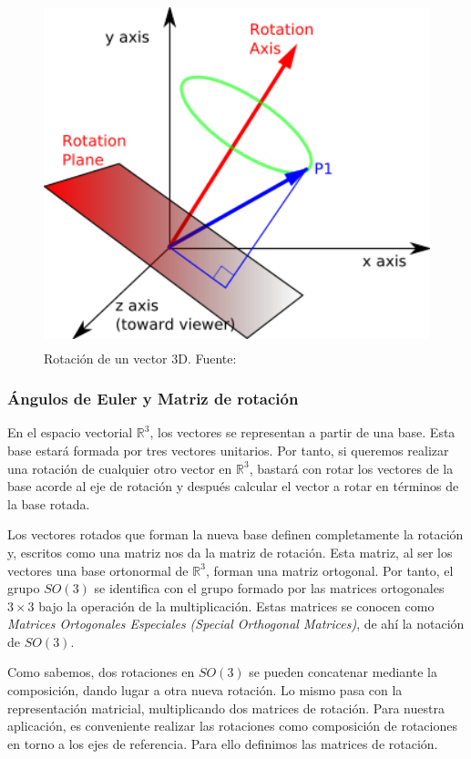 \begin{figure}
	\centering		
	\includegraphics[height=10cm]{figures/rotation.png}
	\caption[Rotación de un vector 3D.]{Rotación de un vector 3D.
	Fuente:~\cite{rotationimage}}
	\label{fig:rotacion}
\end{figure}

\subsubsection{Ángulos de Euler y Matriz de rotación}
\label{makereference5.4.2.1}

En el espacio vectorial $\mathbb{R}^3$, los vectores se representan a partir de
una base. Esta base estará formada por tres vectores unitarios. Por tanto, si
queremos realizar una rotación de cualquier otro vector en $\mathbb{R}^3$,
bastará con rotar los vectores de la base acorde al eje de rotación y después
calcular el vector a rotar en términos de la base rotada. 

Los vectores rotados que forman la nueva base definen completamente la rotación
y, escritos como una matriz nos da la matriz de rotación. Esta matriz, al ser
los vectores una base ortonormal de $\mathbb{R}^3$, forman una matriz ortogonal.
Por tanto, el grupo $SO(3)$ se identifica con el grupo formado por las matrices
ortogonales $3\times 3$ bajo la operación de la multiplicación. Estas matrices
se conocen como \textit{Matrices Ortogonales Especiales (Special Orthogonal
Matrices)}, de ahí la notación de $SO(3)$. 

Como sabemos, dos rotaciones en $SO(3)$ se pueden concatenar mediante la
composición, dando lugar a otra nueva rotación. Lo mismo pasa con la
representación matricial, multiplicando dos matrices de rotación. Para nuestra
aplicación, es conveniente realizar las rotaciones como composición de
rotaciones en torno a los ejes de referencia. Para ello definimos las matrices
de rotación. 


